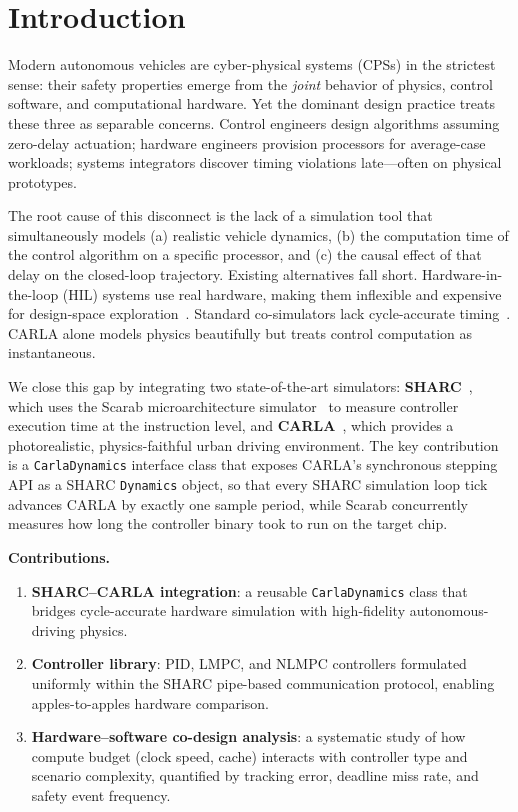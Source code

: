 \documentclass[conference]{IEEEtran}
\begin{document}
\section{Introduction}\label{sec:intro}

Modern autonomous vehicles are cyber-physical systems (CPSs) in the
strictest sense: their safety properties emerge from the \emph{joint}
behavior of physics, control software, and computational hardware.  Yet
the dominant design practice treats these three as separable concerns.
Control engineers design algorithms assuming zero-delay actuation;
hardware engineers provision processors for average-case workloads;
systems integrators discover timing violations late—often on physical
prototypes.

The root cause of this disconnect is the lack of a simulation tool that
simultaneously models (a) realistic vehicle dynamics, (b) the
computation time of the control algorithm on a specific processor, and
(c) the causal effect of that delay on the closed-loop trajectory.
Existing alternatives fall short.  Hardware-in-the-loop (HIL) systems
use real hardware, making them inflexible and expensive for design-space
exploration~\cite{mihalic2022hil}.  Standard co-simulators lack
cycle-accurate timing~\cite{torngren2006cosim}.  CARLA alone models
physics beautifully but treats control computation as instantaneous.

We close this gap by integrating two state-of-the-art simulators:
\textbf{SHARC}~\cite{wintz2025sharc}, which uses the Scarab
microarchitecture simulator~\cite{scarab} to measure controller
execution time at the instruction level, and \textbf{CARLA}~\cite{dosovitskiy2017carla},
which provides a photorealistic, physics-faithful urban driving
environment.  The key contribution is a \texttt{CarlaDynamics}
interface class that exposes CARLA's synchronous stepping API as a
SHARC \texttt{Dynamics} object, so that every SHARC simulation loop
tick advances CARLA by exactly one sample period, while Scarab
concurrently measures how long the controller binary took to run on
the target chip.

\smallskip\noindent\textbf{Contributions.}
\begin{enumerate}
  \item \textbf{SHARC--CARLA integration}: a reusable \texttt{CarlaDynamics}
    class that bridges cycle-accurate hardware simulation with
    high-fidelity autonomous-driving physics.
  \item \textbf{Controller library}: PID, LMPC, and NLMPC controllers
    formulated uniformly within the SHARC pipe-based communication
    protocol, enabling apples-to-apples hardware comparison.
  \item \textbf{Hardware--software co-design analysis}: a systematic
    study of how compute budget (clock speed, cache) interacts with
    controller type and scenario complexity, quantified by tracking
    error, deadline miss rate, and safety event frequency.
\end{enumerate}
\end{document}
